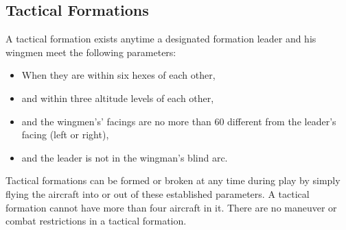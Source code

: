 {\subsection{Tactical Formations}

A tactical formation exists anytime a designated formation leader and his wingmen meet the following parameters:

\begin{itemize}
    \item When they are within six hexes of each other,
    \item and within three altitude levels of each other,
    \item and the wingmen’s' facings are no more than 60{\deg} different from the leader's facing (left or right),
    \item and the leader is not in the wingman's blind arc.
\end{itemize}

Tactical formations can be formed or broken at any time during play by simply flying the aircraft into or out of these established parameters. A tactical formation cannot have more than four aircraft in it. There are no maneuver or combat restrictions in a tactical formation.
}